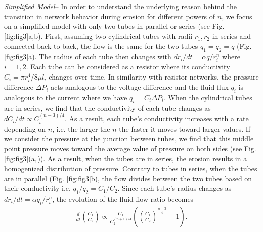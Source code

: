 \documentclass[%
 reprint,
 amsmath,amssymb,
 aps,
]{revtex4-1}
\begin{document}
%



\textit{Simplified Model}-- In order to understand the underlying reason behind the transition in network behavior during erosion for different powers of $n$, we focus on a simplified model with only two tubes in parallel or series (see Fig. \ref{fig:fig3}a,b). First, assuming two cylindrical tubes with radii $r_1,r_2$ in series and connected back to back, the flow is the same for the two tubes $ q_1 = q_2 = q$ (Fig. \ref{fig:fig3}a). The radius of each tube then changes with $dr_i/dt = \alpha q/r_i^n$ where $i=1,2$. Each tube can be considered as a resistor where its conductivity  $C_i =\pi r_i^4/8\mu l_i$ changes over time. In similarity with resistor networks, the pressure difference $\Delta P_i$ acts analogous to the voltage difference and the fluid flux $q_i$ is analogous to the current where we have $q_i = C_i \Delta P_i$. When the cylindrical tubes are in series, we find that the conductivity of each tube changes as $dC_i/dt \propto C_i^{(n-3)/4}$. As a result, each tube's conductivity increases with a rate depending on $n$, i.e. the larger the $n$ the faster it moves toward larger values. If we consider the pressure at the junction between tubes, we find that this middle point pressure moves toward the average value of pressure on both sides (see Fig. \ref{fig:fig3}(a$_1$)). As a result, when the tubes are in series, the erosion results in a homogenized distribution of pressure. Contrary to tubes in series, when the tubes are in parallel (Fig. \ref{fig:fig3}b), the flow divides between the two tubes based on their conductivity i.e. $q_1/q_2 = C_1/C_2$. Since each tube's radius changes as $dr_i/dt = \alpha q_i/r_i^n$, the evolution of the fluid flow ratio becomes 
\begin{align}
 \frac{d}{dt}\left( \frac{C_1}{C_2}\right) \propto  \frac{C_1}{C^{(n+1)/4}_2} \left( \left( \frac{C_1}{C_2}\right)^{\frac{n-3}{4}} - 1 \right). \label{eq:dyn-paral}
\end{align}
\end{document}
